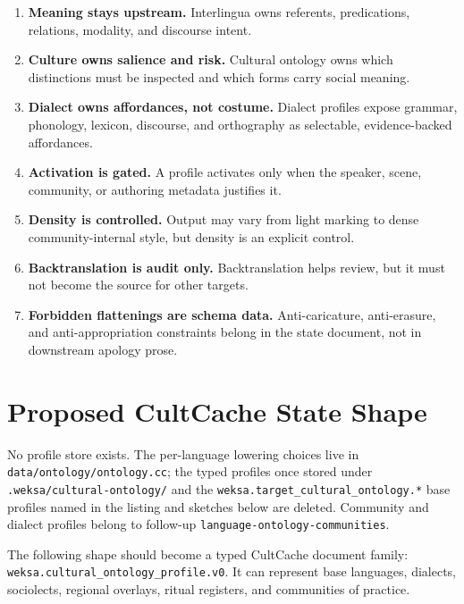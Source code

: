 \documentclass[11pt]{article}
\begin{document}
\begin{enumerate}
  \item \textbf{Meaning stays upstream.} Interlingua owns referents,
  predications, relations, modality, and discourse intent.
  \item \textbf{Culture owns salience and risk.} Cultural ontology owns which
  distinctions must be inspected and which forms carry social meaning.
  \item \textbf{Dialect owns affordances, not costume.} Dialect profiles expose
  grammar, phonology, lexicon, discourse, and orthography as selectable,
  evidence-backed affordances.
  \item \textbf{Activation is gated.} A profile activates only when the speaker,
  scene, community, or authoring metadata justifies it.
  \item \textbf{Density is controlled.} Output may vary from light marking to
  dense community-internal style, but density is an explicit control.
  \item \textbf{Backtranslation is audit only.} Backtranslation helps review,
  but it must not become the source for other targets.
  \item \textbf{Forbidden flattenings are schema data.} Anti-caricature,
  anti-erasure, and anti-appropriation constraints belong in the state document,
  not in downstream apology prose.
\end{enumerate}

\section{Proposed CultCache State Shape}

No profile store exists. The per-language lowering choices live in
\texttt{data/ontology/ontology.cc}; the typed profiles once stored under
\texttt{.weksa/cultural-ontology/} and the \texttt{weksa.target\_cultural\_ontology.*}
base profiles named in the listing and sketches below are deleted. Community and dialect
profiles belong to follow-up \texttt{language-ontology-communities}.

The following shape should become a typed CultCache document family:
\texttt{weksa.cultural\_ontology\_profile.v0}. It can represent base languages,
dialects, sociolects, regional overlays, ritual registers, and communities of
practice.
\end{document}
